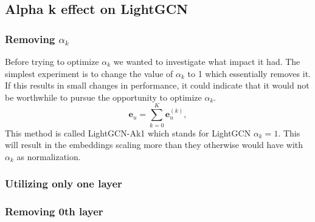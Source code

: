 \subsection{Alpha k effect on LightGCN}

\subsubsection{Removing $\alpha_k$}
Before trying to optimize $\alpha_k$ we wanted to investigate what impact it had.
The simplest experiment is to change the value of $\alpha_k$ to 1 which essentially removes it.
If this results in small changes in performance, it could indicate that it would not be worthwhile to pursue the opportunity to optimize $\alpha_k$.
\begin{equation}
    \mathbf{e}_u = \sum_{k=0}^{K} \mathbf{e}_u^{(k)},
    \label{eq:lightgcn-sum}
\end{equation}
This method is called LightGCN-Ak1 which stands for LightGCN $\alpha_k = 1$.
This will result in the embeddings scaling more than they otherwise would have with $\alpha_k$ as normalization.

\subsubsection{Utilizing only one layer}

\subsubsection{Removing 0th layer}